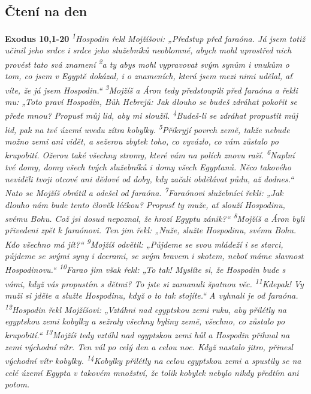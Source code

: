 \documentclass[11pt]{article}
\begin{document}
\subsection*{Čtení na den}
\textbf{Exodus 10,1-20}
\newline
\textit{
\textsuperscript{1}Hospodin řekl Mojžíšovi: „Předstup před faraóna. Já jsem totiž učinil jeho srdce i srdce jeho služebníků neoblomné, abych mohl uprostřed nich provést tato svá znamení
\textsuperscript{2}a ty abys mohl vypravovat svým synům i vnukům o tom, co jsem v Egyptě dokázal, i o znameních, která jsem mezi nimi udělal, ať víte, že já jsem Hospodin.“
\textsuperscript{3}Mojžíš a Áron tedy předstoupili před faraóna a řekli mu: „Toto praví Hospodin, Bůh Hebrejů: Jak dlouho se budeš zdráhat pokořit se přede mnou? Propusť můj lid, aby mi sloužil.
\textsuperscript{4}Budeš-li se zdráhat propustit můj lid, pak na tvé území uvedu zítra kobylky.
\textsuperscript{5}Přikryjí povrch země, takže nebude možno zemi ani vidět, a sežerou zbytek toho, co vyvázlo, co vám zůstalo po krupobití. Ožerou také všechny stromy, které vám na polích znovu raší.
\textsuperscript{6}Naplní tvé domy, domy všech tvých služebníků i domy všech Egypťanů. Něco takového neviděli tvoji otcové ani dědové od doby, kdy začali obdělávat půdu, až dodnes.“ Nato se Mojžíš obrátil a odešel od faraóna.
\textsuperscript{7}Faraónovi služebníci řekli: „Jak dlouho nám bude tento člověk léčkou? Propusť ty muže, ať slouží Hospodinu, svému Bohu. Což jsi dosud nepoznal, že hrozí Egyptu zánik?“
\textsuperscript{8}Mojžíš a Áron byli přivedeni zpět k faraónovi. Ten jim řekl: „Nuže, služte Hospodinu, svému Bohu. Kdo všechno má jít?“
\textsuperscript{9}Mojžíš odvětil: „Půjdeme se svou mládeží i se starci, půjdeme se svými syny i dcerami, se svým bravem i skotem, neboť máme slavnost Hospodinovu.“
\textsuperscript{10}Farao jim však řekl: „To tak! Myslíte si, že Hospodin bude s vámi, když vás propustím s dětmi? To jste si zamanuli špatnou věc.
\textsuperscript{11}Kdepak! Vy muži si jděte a služte Hospodinu, když o to tak stojíte.“ A vyhnali je od faraóna.
\textsuperscript{12}Hospodin řekl Mojžíšovi: „Vztáhni nad egyptskou zemi ruku, aby přilétly na egyptskou zemi kobylky a sežraly všechny byliny země, všechno, co zůstalo po krupobití.“
\textsuperscript{13}Mojžíš tedy vztáhl nad egyptskou zemi hůl a Hospodin přihnal na zemi východní vítr. Ten vál po celý den a celou noc. Když nastalo jitro, přinesl východní vítr kobylky.
\textsuperscript{14}Kobylky přilétly na celou egyptskou zemi a spustily se na celé území Egypta v takovém množství, že tolik kobylek nebylo nikdy předtím ani potom.
}
\end{document}
